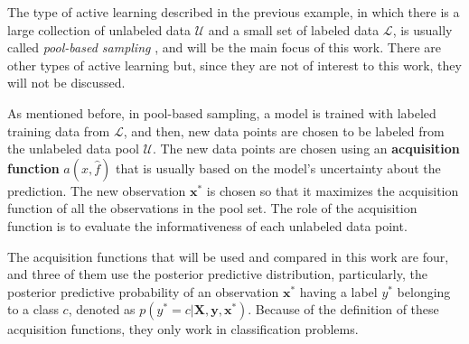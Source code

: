 
The type of active learning described in the previous example, in which there is a large collection of unlabeled data $\mathcal{U}$ and a small set of labeled data $\mathcal{L}$, is usually called \textit{pool-based sampling} \cite{settles.tr09}, and will be the main focus of this work. There are other types of active learning but, since they are not of interest to this work, they will not be discussed.

As mentioned before, in pool-based sampling, a model is trained with labeled training data from $\mathcal{L}$, and then, new data points are chosen to be labeled from the unlabeled data pool $\mathcal{U}$. The new data points are chosen using an \textbf{acquisition function} $a(x, \hat{f})$ that is usually based on the model's uncertainty about the prediction. The new observation $\boldsymbol{x}^*$ is chosen so that it maximizes the acquisition function of all the observations in the pool set. The role of the acquisition function is to evaluate the informativeness of each unlabeled data point.

The acquisition functions that will be used and compared in this work are four, and three of them use the posterior predictive distribution, particularly, the posterior predictive probability of an observation $\boldsymbol{x}^*$ having a label $y^*$ belonging to a class $c$, denoted as $p(y^* = c | \boldsymbol{X}, \boldsymbol{y}, \boldsymbol{x}^*)$. Because of the definition of these acquisition functions, they only work in classification problems.

